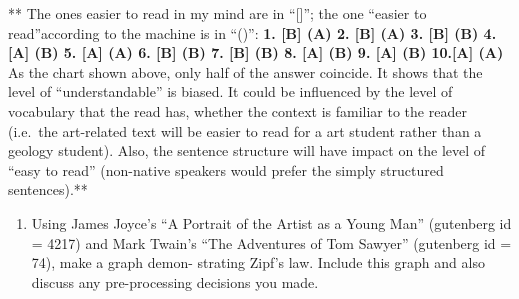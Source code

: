 \documentclass[]{article}
\newenvironment{Shaded}{\begin{snugshade}}{\end{snugshade}}
\newcommand{\KeywordTok}[1]{\textcolor[rgb]{0.13,0.29,0.53}{\textbf{#1}}}
\newcommand{\DataTypeTok}[1]{\textcolor[rgb]{0.13,0.29,0.53}{#1}}
\newcommand{\DecValTok}[1]{\textcolor[rgb]{0.00,0.00,0.81}{#1}}
\newcommand{\StringTok}[1]{\textcolor[rgb]{0.31,0.60,0.02}{#1}}
\newcommand{\CommentTok}[1]{\textcolor[rgb]{0.56,0.35,0.01}{\textit{#1}}}
\newcommand{\OtherTok}[1]{\textcolor[rgb]{0.56,0.35,0.01}{#1}}
\newcommand{\OperatorTok}[1]{\textcolor[rgb]{0.81,0.36,0.00}{\textbf{#1}}}
\newcommand{\NormalTok}[1]{#1}
\providecommand{\tightlist}{%
  \setlength{\itemsep}{0pt}\setlength{\parskip}{0pt}}
\begin{document}
** The ones easier to read in my mind are in ``{[}{]}''; the one
``easier to read''according to the machine is in ``()'':\textbf{ 1.
{[}B{]} (A) 2. {[}B{]} (A) 3. {[}B{]} (B) 4. {[}A{]} (B) 5. {[}A{]} (A)
6. {[}B{]} (B) 7. {[}B{]} (B) 8. {[}A{]} (B) 9. {[}A{]} (B) 10.{[}A{]}
(A) } As the chart shown above, only half of the answer coincide. It
shows that the level of ``understandable'' is biased. It could be
influenced by the level of vocabulary that the read has, whether the
context is familiar to the reader (i.e.~the art-related text will be
easier to read for a art student rather than a geology student). Also,
the sentence structure will have impact on the level of ``easy to read''
(non-native speakers would prefer the simply structured sentences).**

\begin{enumerate}
\def\labelenumi{\arabic{enumi}.}
\setcounter{enumi}{6}
\tightlist
\item
  Using James Joyce's ``A Portrait of the Artist as a Young Man''
  (gutenberg id = 4217) and Mark Twain's ``The Adventures of Tom
  Sawyer'' (gutenberg id = 74), make a graph demon- strating Zipf's law.
  Include this graph and also discuss any pre-processing decisions you
  made.
\end{enumerate}

\begin{Shaded}
\end{Shaded}
\end{document}
